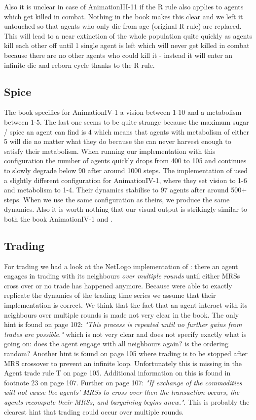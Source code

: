Also it is unclear in case of AnimationIII-11 if the R rule also applies to agents which get killed in combat. Nothing in the book makes this clear and we left it untouched so that agents who only die from age (original R rule) are replaced. This will lead to a near extinction of the whole population quite quickly as agents kill each other off until 1 single agent is left which will never get killed in combat because there are no other agents who could kill it - instead it will enter an infinite die and  reborn cycle thanks to the R rule.

\subsection{Spice}
The book specifies for AnimationIV-1 a vision between 1-10 and a metabolism between 1-5. The last one seems to be quite strange because the maximum sugar / spice an agent can find is 4 which means that agents with metabolism of either 5 will die no matter what they do because the can never harvest enough to satisfy their metabolism. When running our implementation with this configuration the number of agents quickly drops from 400 to 105 and continues to slowly degrade below 90 after around 1000 steps.
The implementation of \cite{weaver_replicating_2009} used a slightly different configuration for AnimationIV-1, where they set vision to 1-6 and metabolism to 1-4. Their dynamics stabilise to 97 agents after around 500+ steps. When we use the same configuration as theirs, we produce the same dynamics.
Also it is worth nothing that our visual output is strikingly similar to both the book AnimationIV-1 and \cite{weaver_replicating_2009}.

\subsection{Trading}
For trading we had a look at the NetLogo implementation of \cite{weaver_replicating_2009}: there an agent engages in trading with its neighbours \textit{over multiple rounds} until either MRSs cross over or no trade has happened anymore. Because \cite{weaver_replicating_2009} were able to exactly replicate the dynamics of the trading time series we assume that their implementation is correct. We think that the fact that an agent interact with its neighbours over multiple rounds is made not very clear in the book. The only hint is found on page 102: \textit{"This process is repeated until no further gains from trades are possible."} which is not very clear and does not specify exactly what is going on: does the agent engage with all neighbours again? is the ordering random? Another hint is found on page 105 where trading is to be stopped after MRS crossover to prevent an infinite loop. Unfortunately this is missing in the Agent trade rule T on page 105. Additional information on this is found in footnote 23 on page 107. Further on page 107: \textit{"If exchange of the commodities will not cause the agents' MRSs to cross over then the transaction occurs, the agents recompute their MRSs, and bargaining begins anew."}. This is probably the clearest hint that trading could occur over multiple rounds.

